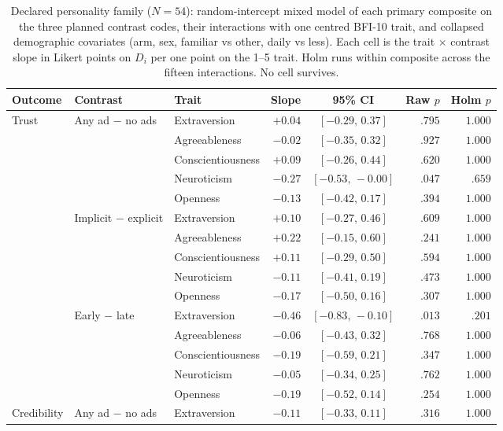 \begin{table}[H]
\centering
\footnotesize
\caption{Declared personality family (\(N=54\)): random-intercept mixed model of each primary composite on the three planned contrast codes, their interactions with one centred BFI-10 trait, and collapsed demographic covariates (arm, sex, familiar vs other, daily vs less). Each cell is the trait \(\times\) contrast slope in Likert points on \(D_i\) per one point on the 1--5 trait. Holm runs within composite across the fifteen interactions. No cell survives.}
\label{tab:beh-personality}
\setlength{\tabcolsep}{3.5pt}
\begin{tabular}{@{}ll l r c r r@{}}
\toprule
Outcome & Contrast & Trait & Slope & 95\% CI & Raw \(p\) & Holm \(p\) \\
\midrule
Trust & Any ad − no ads & Extraversion & $+0.04$ & $[-0.29,\,0.37]$ & $.795$ & $1.000$ \\
 &  & Agreeableness & $-0.02$ & $[-0.35,\,0.32]$ & $.927$ & $1.000$ \\
 &  & Conscientiousness & $+0.09$ & $[-0.26,\,0.44]$ & $.620$ & $1.000$ \\
 &  & Neuroticism & $-0.27$ & $[-0.53,\,-0.00]$ & $.047$ & $.659$ \\
 &  & Openness & $-0.13$ & $[-0.42,\,0.17]$ & $.394$ & $1.000$ \\
 & Implicit − explicit & Extraversion & $+0.10$ & $[-0.27,\,0.46]$ & $.609$ & $1.000$ \\
 &  & Agreeableness & $+0.22$ & $[-0.15,\,0.60]$ & $.241$ & $1.000$ \\
 &  & Conscientiousness & $+0.11$ & $[-0.29,\,0.50]$ & $.594$ & $1.000$ \\
 &  & Neuroticism & $-0.11$ & $[-0.41,\,0.19]$ & $.473$ & $1.000$ \\
 &  & Openness & $-0.17$ & $[-0.50,\,0.16]$ & $.307$ & $1.000$ \\
 & Early − late & Extraversion & $-0.46$ & $[-0.83,\,-0.10]$ & $.013$ & $.201$ \\
 &  & Agreeableness & $-0.06$ & $[-0.43,\,0.32]$ & $.768$ & $1.000$ \\
 &  & Conscientiousness & $-0.19$ & $[-0.59,\,0.21]$ & $.347$ & $1.000$ \\
 &  & Neuroticism & $-0.05$ & $[-0.34,\,0.25]$ & $.762$ & $1.000$ \\
 &  & Openness & $-0.19$ & $[-0.52,\,0.14]$ & $.254$ & $1.000$ \\
\midrule
Credibility & Any ad − no ads & Extraversion & $-0.11$ & $[-0.33,\,0.11]$ & $.316$ & $1.000$ \\

\end{tabular}
\end{table}
